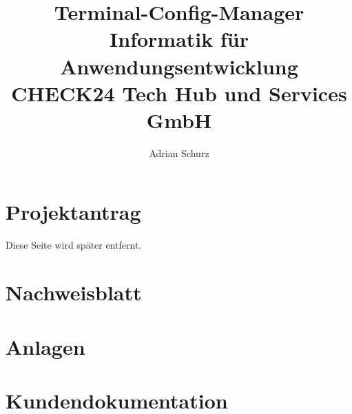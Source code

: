 \documentclass[a4paper,11pt,draft=false,bibliography=totoc]{scrartcl} %
\author{Adrian Schurz}
\title{Terminal-Config-Manager\\
	Informatik für Anwendungsentwicklung\\
	CHECK24 Tech Hub und Services GmbH\\
	}
\begin{document}

\maketitle
{}
\newpage

\section{Projektantrag}
\begin{center}
	Diese Seite wird später entfernt.
\end{center}


\section{Nachweisblatt} \label{Nachweisblatt}
\paragraph{}

\newpage
\tableofcontents
\newpage




\section{Anlagen} \label{Anlagen}

\section{Kundendokumentation} \label{Kundendokumentation}











\printbibliography

\printglossaries
\end{document}
